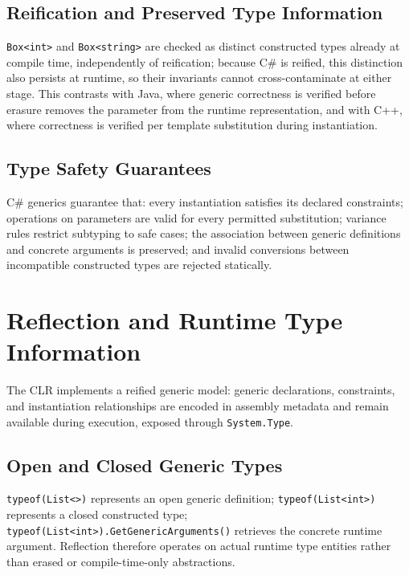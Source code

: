 \documentclass[11pt]{report}
\begin{document}
\subsection{Reification and Preserved Type Information}
\label{CSharpGenerics:TypeSafety:Reification}
\texttt{Box<int>} and \texttt{Box<string>} are checked as distinct
constructed types already at compile time, independently of reification;
because C\# is reified, this distinction also persists at runtime, so
their invariants cannot cross-contaminate at either stage. This
contrasts with Java, where generic correctness is verified before erasure
removes the parameter from the runtime representation, and with C++, where
correctness is verified per template substitution during instantiation.

\subsection{Type Safety Guarantees}

C\# generics guarantee that: every instantiation satisfies its declared
constraints; operations on parameters are valid for every permitted
substitution; variance rules restrict subtyping to safe cases; the
association between generic definitions and concrete arguments is
preserved; and invalid conversions between incompatible constructed types
are rejected statically.


\section{Reflection and Runtime Type Information}
\label{CSharpGenerics:Reflection}

The CLR implements a reified generic model: generic declarations,
constraints, and instantiation relationships are encoded in assembly
metadata and remain available during execution, exposed through
\texttt{System.Type}.

\subsection{Open and Closed Generic Types}

\texttt{typeof(List<>)} represents an open generic definition;
\texttt{typeof(List<int>)} represents a closed constructed type;
\texttt{typeof(List<int>).GetGenericArguments()} retrieves the concrete
runtime argument. Reflection therefore operates on actual runtime type
entities rather than erased or compile-time-only abstractions.
\end{document}
